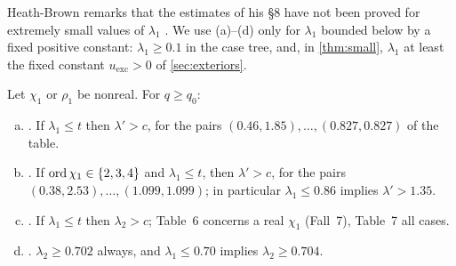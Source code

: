 Heath-Brown remarks that the estimates of his \S8 have not been proved for extremely small values
of $\lambda_1$ \cite[\S8]{HeathBrown1992zero}. We use (a)--(d) only for $\lambda_1$ bounded below by a
fixed positive constant: $\lambda_1\ge0.1$ in the case tree, and, in \cref{thm:small}, $\lambda_1$ at
least the fixed constant $u_{\mathrm{exc}}>0$ of \cref{sec:exteriors}.

\begin{inp}\label{inp:complextables}
Let $\chi_1$ or $\rho_1$ be nonreal. For $q\ge q_0$:
\begin{enumerate}[(a)]
  \item \cite[Table~2$'$, p.~62]{Xylouris2011nullstellen}. If $\lambda_1\le t$ then $\lambda'>c$, for the pairs
    $(0.46,1.85),\dots,(0.827,0.827)$ of the table.
  \item \cite[Table~3, p.~45]{Xylouris2011nullstellen}. If $\operatorname{ord}\chi_1\in\{2,3,4\}$ and $\lambda_1\le t$, then
    $\lambda'>c$, for the pairs $(0.38,2.53),\dots,(1.099,1.099)$; in particular $\lambda_1\le0.86$ implies
    $\lambda'>1.35$.
  \item \cite[Tables~6 and~7, p.~53]{Xylouris2011nullstellen}. If $\lambda_1\le t$ then $\lambda_2>c$; Table~6
    concerns a real $\chi_1$ (Fall~7), Table~7 all cases.
  \item \cite[Lemma~9.4 and Table~10]{HeathBrown1992zero}. $\lambda_2\ge0.702$ always, and
    $\lambda_1\le0.70$ implies $\lambda_2\ge0.704$.
\end{enumerate}
\end{inp}

